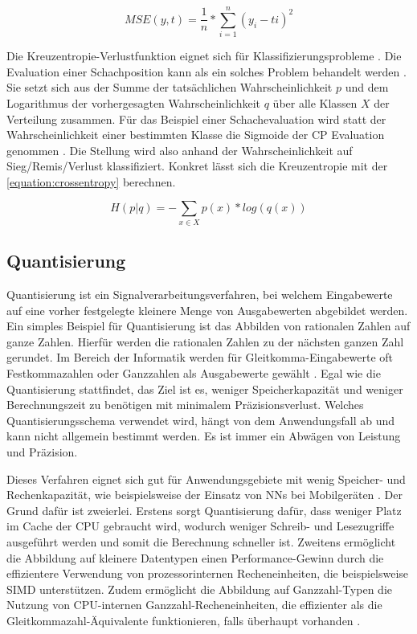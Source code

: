 \begin{equation}
  MSE(y, t) = \frac{1}{n}*\sum^{n}_{i=1}(y_{i}-t{i})^{2}
  \label{equation:mse}
\end{equation}

Die Kreuzentropie-Verlustfunktion eignet sich für Klassifizierungsprobleme \cite{Kline2005}. Die Evaluation einer Schachposition kann als ein solches Problem behandelt werden \cite{StockfishNNUE}. Sie setzt sich aus der Summe der tatsächlichen Wahrscheinlichkeit $p$ und dem Logarithmus der vorhergesagten Wahrscheinlichkeit $q$ über alle Klassen $X$ der Verteilung zusammen. Für das Beispiel einer Schachevaluation wird statt der Wahrscheinlichkeit einer bestimmten Klasse die Sigmoide der \ac{CP} Evaluation genommen \cite{StockfishNNUE}. Die Stellung wird also anhand der Wahrscheinlichkeit auf Sieg/Remis/Verlust klassifiziert. Konkret lässt sich die Kreuzentropie mit der \autoref{equation:crossentropy} berechnen.

\begin{equation}
  H(p|q) = -\sum_{x \in X} p(x) * log(q(x))
  \label{equation:crossentropy}
\end{equation}


\subsection{Quantisierung}

Quantisierung ist ein Signalverarbeitungsverfahren, bei welchem Eingabewerte auf eine vorher festgelegte kleinere Menge von Ausgabewerten abgebildet werden. Ein simples Beispiel für Quantisierung ist das Abbilden von rationalen Zahlen auf ganze Zahlen. Hierfür werden die rationalen Zahlen zu der nächsten ganzen Zahl gerundet. Im Bereich der Informatik werden für Gleitkomma-Eingabewerte oft Festkommazahlen oder Ganzzahlen als Ausgabewerte gewählt \cite{Gysel2016}. Egal wie die Quantisierung stattfindet, das Ziel ist es, weniger Speicherkapazität und weniger Berechnungszeit zu benötigen mit minimalem Präzisionsverlust. Welches Quantisierungsschema verwendet wird, hängt von dem Anwendungsfall ab und kann nicht allgemein bestimmt werden. Es ist immer ein Abwägen von Leistung und Präzision.

Dieses Verfahren eignet sich gut für Anwendungsgebiete mit wenig Speicher- und Rechenkapazität, wie beispielsweise der Einsatz von \acp{NN} bei Mobilgeräten \cite{MaQuantization2019, Gysel2016}. Der Grund dafür ist zweierlei. Erstens sorgt Quantisierung dafür, dass weniger Platz im Cache der CPU gebraucht wird, wodurch weniger Schreib- und Lesezugriffe ausgeführt werden und somit die Berechnung schneller ist. Zweitens ermöglicht die Abbildung auf kleinere Datentypen einen Performance-Gewinn durch die effizientere Verwendung von prozessorinternen Recheneinheiten, die beispielsweise \ac{SIMD} unterstützen. Zudem ermöglicht die Abbildung auf Ganzzahl-Typen die Nutzung von CPU-internen Ganzzahl-Recheneinheiten, die effizienter als die Gleitkommazahl-Äquivalente funktionieren, falls überhaupt vorhanden \cite{Jacob2017}.

